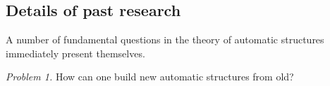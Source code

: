 \documentclass[12pt]{article}
\theoremstyle{plain} \numberwithin{equation}{section}
\theoremstyle{definition}
\def\tit#1{\subsection*{#1}}
\begin{document}








\tit{Details of past research}

A number of fundamental questions in the theory of automatic structures immediately present themselves. 

{\em Problem 1.}  How can one build new automatic structures from old? 
\end{document}
